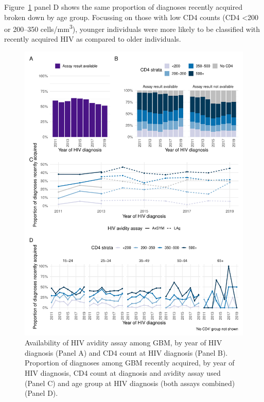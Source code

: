 Figure~\ref{fig:rita_avail} panel D shows the same proportion of diagnoses recently acquired broken down by age group. Focussing on those with low CD4 counts (CD4 <200 or 200--350 cells/mm\textsuperscript{3}), younger individuals were more likely to be classified with recently acquired HIV as compared to older individuals.
\newline

\begin{figure}[htbp!]
  \centering
  \includegraphics[width=\textwidth]{rita_availability_by_cd4.pdf}
  \caption[Availability of HIV avidity assay among GBM]{Availability of HIV avidity assay among GBM, by year of HIV diagnosis (Panel A) and CD4 count at HIV diagnosis (Panel B). Proportion of diagnoses among GBM recently acquired, by year of HIV diagnosis, CD4 count at diagnosis and avidity assay used (Panel C) and age group at HIV diagnosis (both assays combined) (Panel D).}\label{fig:rita_avail}
\end{figure}

